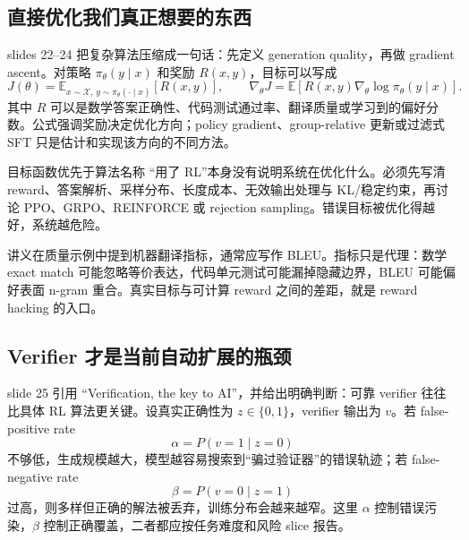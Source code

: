 
\subsection{直接优化我们真正想要的东西}

slides 22--24 把复杂算法压缩成一句话：先定义 generation quality，再做 gradient ascent。对策略 $\pi_\theta(y\mid x)$ 和奖励 $R(x,y)$，目标可以写成
\[
J(\theta)=\mathbb E_{x\sim\mathcal X,\,y\sim\pi_\theta(\cdot\mid x)}[R(x,y)],
\qquad
\nabla_\theta J
=\mathbb E[R(x,y)\nabla_\theta\log\pi_\theta(y\mid x)].
\]
其中 $R$ 可以是数学答案正确性、代码测试通过率、翻译质量或学习到的偏好分数。公式强调奖励决定优化方向；policy gradient、group-relative 更新或过滤式 SFT 只是估计和实现该方向的不同方法。




\begin{importantbox}{目标函数优先于算法名称}
“用了 RL”本身没有说明系统在优化什么。必须先写清 reward、答案解析、采样分布、长度成本、无效输出处理与 KL/稳定约束，再讨论 PPO、GRPO、REINFORCE 或 rejection sampling。错误目标被优化得越好，系统越危险。
\end{importantbox}

讲义在质量示例中提到机器翻译指标，通常应写作 BLEU。指标只是代理：数学 exact match 可能忽略等价表达，代码单元测试可能漏掉隐藏边界，BLEU 可能偏好表面 n-gram 重合。真实目标与可计算 reward 之间的差距，就是 reward hacking 的入口。

\subsection{Verifier 才是当前自动扩展的瓶颈}

slide 25 引用 “Verification, the key to AI”，并给出明确判断：可靠 verifier 往往比具体 RL 算法更关键。设真实正确性为 $z\in\{0,1\}$，verifier 输出为 $v$。若 false-positive rate
\[
\alpha=P(v=1\mid z=0)
\]
不够低，生成规模越大，模型越容易搜索到“骗过验证器”的错误轨迹；若 false-negative rate
\[
\beta=P(v=0\mid z=1)
\]
过高，则多样但正确的解法被丢弃，训练分布会越来越窄。这里 $\alpha$ 控制错误污染，$\beta$ 控制正确覆盖，二者都应按任务难度和风险 slice 报告。

